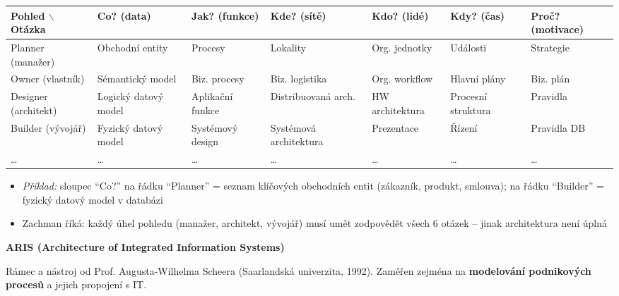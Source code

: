 \begin{center}
\begin{tabular}{p{2.2cm}p{1.7cm}p{1.7cm}p{1.7cm}p{1.7cm}p{1.7cm}p{1.7cm}}
\toprule
\textbf{Pohled} $\backslash$ \textbf{Otázka} & \textbf{Co?} \newline (data) & \textbf{Jak?} \newline (funkce) & \textbf{Kde?} \newline (sítě) & \textbf{Kdo?} \newline (lidé) & \textbf{Kdy?} \newline (čas) & \textbf{Proč?} \newline (motivace) \\
\midrule
Planner (manažer) & Obchodní entity & Procesy & Lokality & Org. jednotky & Události & Strategie \\
Owner (vlastník) & Sémantický model & Biz. procesy & Biz. logistika & Org. workflow & Hlavní plány & Biz. plán \\
Designer (architekt) & Logický datový model & Aplikační funkce & Distribuovaná arch. & HW architektura & Procesní struktura & Pravidla \\
Builder (vývojář) & Fyzický datový model & Systémový design & Systémová architektura & Prezentace & Řízení & Pravidla DB \\
\ldots & \ldots & \ldots & \ldots & \ldots & \ldots & \ldots \\
\bottomrule
\end{tabular}
\end{center}

\begin{itemize}
  \item \textit{Příklad:} sloupec ``Co?'' na řádku ``Planner'' = seznam klíčových obchodních entit
    (zákazník, produkt, smlouva); na řádku ``Builder'' = fyzický datový model v databázi
  \item Zachman říká: každý úhel pohledu (manažer, architekt, vývojář) musí umět zodpovědět
    všech 6 otázek -- jinak architektura není úplná
\end{itemize}

\textbf{ARIS (Architecture of Integrated Information Systems)}

Rámec a nástroj od Prof. Augusta-Wilhelma Scheera (Saarlandská univerzita, 1992).
Zaměřen zejména na \textbf{modelování podnikových procesů} a jejich propojení s IT.

